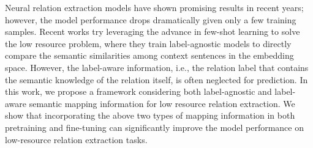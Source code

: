 Neural relation extraction models have shown promising results in recent years; however, the model performance drops dramatically given only a few training samples. Recent works try leveraging the advance in few-shot learning to solve the low resource problem, where they train label-agnostic models to directly compare the semantic similarities among context sentences in the embedding space. However, the label-aware information, i.e., the relation label that contains the semantic knowledge of the relation itself, is often neglected for prediction. In this work, we propose a framework considering both label-agnostic and label-aware semantic mapping information for low resource relation extraction. We show that incorporating the above two types of mapping information in both pretraining and fine-tuning can significantly improve the model performance on low-resource relation extraction tasks.
